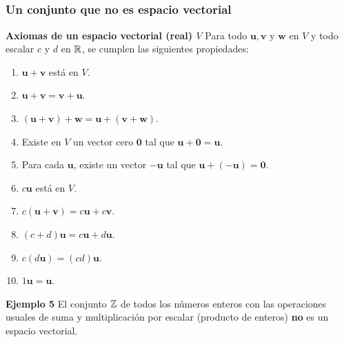 
\subsection{}

{\nologo
\begin{frame}\frametitle{Un conjunto que no es espacio vectorial}

\begin{block}{\textbf{Axiomas de un espacio vectorial (real) $V$}}	
	\justifying
	Para todo $\mathbf{u}, \mathbf{v}$ y $\mathbf{w}$ en $V$ y todo escalar $c$ y $d$ en $\mathbb{R}$, se 
	cumplen las siguientes propiedades: 
	
	\vspace{-3mm}
	\begin{multicols}{2}		
		\begin{enumerate}			
			\justifying
			\item $\mathbf{u}+\mathbf{v}$ está en $V$. %
			\item $\mathbf{u}+\mathbf{v} = \mathbf{v}+\mathbf{u}$. %
			\item $(\mathbf{u}+\mathbf{v})+\mathbf{w} = \mathbf{u}+(\mathbf{v}+\mathbf{w})$. %
			\item Existe en $V$ un vector cero $\mathbf{0}$ tal que $\mathbf{u}+\mathbf{0} = \mathbf{u}$.		
			\item Para cada $\mathbf{u}$, existe un vector $-\mathbf{u}$ tal que
			$ \mathbf{u}+(-\mathbf{u}) = \mathbf{0}$.
			\columnbreak
			\item $c\mathbf{u}$ está en $V$. 
			\item $c(\mathbf{u}+\mathbf{v}) = c\mathbf{u} + c\mathbf{v}$.
			\item $(c+d)\mathbf{u} = c\mathbf{u} + d\mathbf{u}$.
			\item $c(d\mathbf{u}) = (cd)\mathbf{u}$.
			\item $1\mathbf{u} = \mathbf{u}$.
		\end{enumerate}		
	\end{multicols}
	
	\vspace{-2mm}
\end{block}

\begin{ej}{\textbf{Ejemplo 5}}\justifying
	El conjunto $\mathbb{Z}$ de todos los números enteros con las operaciones usuales de suma
	y multiplicación por escalar (producto de enteros) \textbf{no} es un espacio vectorial.
\end{ej}

\end{frame}
}

